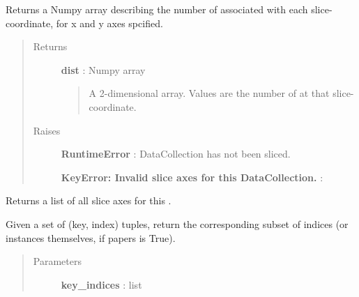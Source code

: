 \documentclass[letterpaper,10pt,english]{sphinxmanual}
\begin{document}
\begin{fulllineitems}
\begin{fulllineitems}
\end{fulllineitems}


\begin{fulllineitems}
\label{tethne:tethne.data.DataCollection.distribution_2d}
Returns a Numpy array describing the number of {\hyperref[tethne:tethne.data.Paper]{}}
associated with each slice-coordinate, for x and y axes spcified.
\begin{quote}\begin{description}
\item[{Returns }] \leavevmode
\textbf{dist} : Numpy array
\begin{quote}

A 2-dimensional array. Values are the number of
{\hyperref[tethne:tethne.data.Paper]{}} at that slice-coordinate.
\end{quote}

\item[{Raises }] \leavevmode
\textbf{RuntimeError} : DataCollection has not been sliced.

\textbf{KeyError: Invalid slice axes for this DataCollection.} :

\end{description}\end{quote}

\end{fulllineitems}


\begin{fulllineitems}
\label{tethne:tethne.data.DataCollection.get_axes}
Returns a list of all slice axes for this {\hyperref[tethne:tethne.data.DataCollection]{}} .

\end{fulllineitems}


\begin{fulllineitems}
\label{tethne:tethne.data.DataCollection.get_by}
Given a set of (key, index) tuples, return the corresponding subset of
{\hyperref[tethne:tethne.data.Paper]{}} indices (or {\hyperref[tethne:tethne.data.Paper]{}} instances themselves, if 
papers is True).
\begin{quote}\begin{description}
\item[{Parameters }] \leavevmode
\textbf{key\_indices} : list
\begin{quote}


\end{quote}
\end{description}
\end{quote}
\end{fulllineitems}
\end{fulllineitems}
\end{document}
